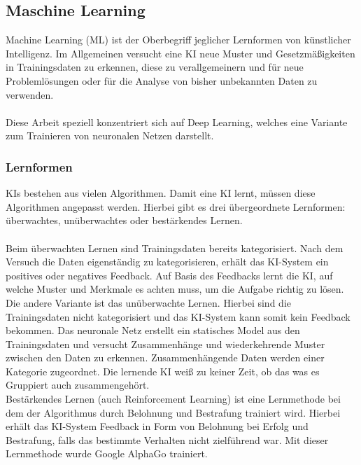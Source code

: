 \documentclass[12pt,oneside,a4paper,parskip]{scrbook}
\begin{document}
\subsection{Maschine Learning}
Machine Learning (ML) ist der Oberbegriff jeglicher Lernformen von künstlicher Intelligenz. Im Allgemeinen versucht eine KI neue Muster und Gesetzmäßigkeiten in Trainingsdaten zu erkennen, diese zu verallgemeinern und für neue Problemlösungen oder für die Analyse von bisher unbekannten Daten zu verwenden\cite{EliminateHumanBias}.
\\\\Diese Arbeit speziell konzentriert sich auf Deep Learning, welches eine Variante zum Trainieren von neuronalen Netzen darstellt.
\subsubsection{Lernformen}
KIs bestehen aus vielen Algorithmen. Damit eine KI lernt, müssen diese Algorithmen angepasst werden. Hierbei gibt es drei übergeordnete Lernformen: überwachtes, unüberwachtes oder bestärkendes Lernen. \\\\
Beim überwachten Lernen sind Trainingsdaten bereits kategorisiert. Nach dem Versuch die Daten eigenständig zu kategorisieren, erhält das KI-System ein positives oder negatives Feedback. Auf Basis des Feedbacks lernt die KI, auf welche Muster und Merkmale es achten muss, um die Aufgabe richtig zu lösen. \\
Die andere Variante ist das unüberwachte Lernen. Hierbei sind die Trainingsdaten nicht kategorisiert und das KI-System kann somit kein Feedback bekommen. Das neuronale Netz erstellt ein statisches Model aus den Trainingsdaten und versucht Zusammenhänge und wiederkehrende Muster zwischen den Daten zu erkennen. Zusammenhängende Daten werden einer Kategorie zugeordnet. Die lernende KI weiß zu keiner Zeit, ob das was es Gruppiert auch zusammengehört.\\
Bestärkendes Lernen (auch Reinforcement Learning) ist eine Lernmethode bei dem der Algorithmus durch Belohnung und Bestrafung trainiert wird. Hierbei erhält das KI-System Feedback in Form von Belohnung bei Erfolg und Bestrafung, falls das bestimmte Verhalten nicht zielführend war. Mit dieser Lernmethode wurde Google AlphaGo trainiert.
\end{document}
